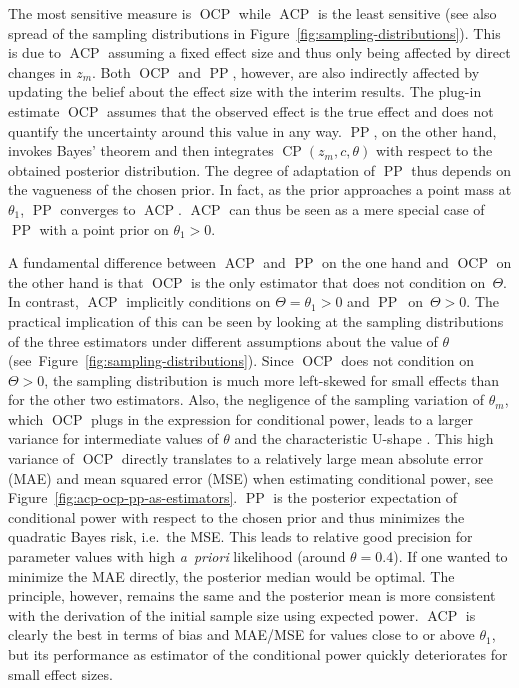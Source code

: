 \documentclass[12pt]{article}
\newcommand{\CP}{\ensuremath{\operatorname{CP}}}
\newcommand{\ACP}{\ensuremath{\operatorname{ACP}}}
\newcommand{\OCP}{\ensuremath{\operatorname{OCP}}}
\newcommand{\PP}{\ensuremath{\operatorname{PP}}}
\begin{document}
The most sensitive measure is $\OCP$ while $\ACP$ is the least sensitive
(see also spread of the sampling distributions in Figure~\ref{fig:sampling-distributions}).
This is due to $\ACP$ assuming a fixed effect size and thus
only being affected by direct changes in $z_m$.
Both $\OCP$ and $\PP$, however, are also indirectly affected by updating
the belief about the effect size with the interim results.
The plug-in estimate $\OCP$ assumes that the observed effect is the
true effect and does not quantify the uncertainty around this value in any way.
$\PP$, on the other hand, invokes Bayes' theorem and then integrates
$\CP(z_m,c,\theta)$ with respect to the obtained posterior distribution.
The degree of adaptation of $\PP$ thus depends
on the vagueness of the chosen prior.
In fact, as the prior approaches a point mass at $\theta_1$, $\PP$ converges
to $\ACP$.
$\ACP$ can thus be seen as a mere special case of $\PP$ with a point prior
on $\theta_1>0$.

A fundamental difference between $\ACP$ and $\PP$ on the one hand and $\OCP$ on the other hand is that
$\OCP$ is the only estimator that does not condition on~$\Theta$.
In contrast, $\ACP$ implicitly conditions on $\Theta=\theta_1>0$ and
$\PP$~on~${\Theta > 0}$.
The practical implication of this can be seen
by looking at the sampling distributions of the
three estimators under different assumptions
about the value of $\theta$ (see~Figure~\ref{fig:sampling-distributions}).
Since $\OCP$ does not condition on $\Theta>0$, the sampling distribution is much more left-skewed for small effects than for the other two estimators.
Also, the negligence of the sampling variation of $\widehat{\theta}_m$, which $\OCP$ plugs in the expression for conditional power, leads to a larger variance for intermediate values of $\theta$ and the characteristic
U-shape \cite{bauer2006}.
This high variance of $\OCP$ directly translates to a relatively large mean absolute error (MAE) and mean squared error (MSE) when estimating conditional power,
see Figure~\ref{fig:acp-ocp-pp-as-estimators}.
$\PP$ is the posterior expectation of conditional power with respect to the chosen prior and thus  minimizes the quadratic Bayes risk, i.e.~the MSE.
This leads to relative good precision for parameter values with high \textit{a~priori} likelihood
(around $\theta=0.4$).
If one wanted to minimize the MAE directly,
the posterior median would be optimal.
The principle, however, remains the same and
the posterior mean is more consistent with the derivation of the initial sample size using expected power.
$\ACP$ is clearly the best in terms of bias and MAE/MSE for values close to or
above $\theta_1$, but its performance as estimator of the conditional power
quickly deteriorates for small effect sizes.
\end{document}
